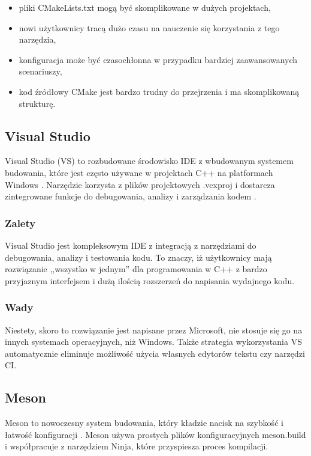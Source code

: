 \begin{itemize}
    \item pliki CMakeLists.txt mogą być skomplikowane w dużych projektach,
    \item nowi użytkownicy tracą dużo czasu na nauczenie się korzystania z tego narzędzia,
    \item konfiguracja może być czasochłonna w przypadku bardziej zaawansowanych scenariuszy,
    \item kod źródłowy CMake jest bardzo trudny do przejrzenia i ma skomplikowaną strukturę.
\end{itemize}

\subsection{Visual Studio}
Visual Studio (VS) to rozbudowane środowisko IDE z wbudowanym systemem budowania, które jest często używane w projektach C++ na platformach Windows \cite{vs}. Narzędzie korzysta z plików projektowych .vcxproj i dostarcza zintegrowane funkcje do debugowania, analizy i zarządzania kodem \cite{vs-cpp-debug}.

\subsubsection{Zalety}
Visual Studio jest kompleksowym IDE z integracją z narzędziami do debugowania, analizy i testowania kodu. To znaczy, iż użytkownicy mają rozwiązanie ,,wszystko w jednym'' dla programowania w C++ z bardzo przyjaznym interfejsem i dużą ilością rozszerzeń do napisania wydajnego kodu.

\subsubsection{Wady}
Niestety, skoro to rozwiązanie jest napisane przez Microsoft, nie stosuje się go na innych systemach operacyjnych, niż Windows. Także strategia wykorzystania VS automatycznie eliminuje możliwość użycia własnych edytorów tekstu czy narzędzi CI.

\subsection{Meson}
Meson to nowoczesny system budowania, który kładzie nacisk na szybkość i łatwość konfiguracji \cite{meson}. Meson używa prostych plików konfiguracyjnych meson.build i współpracuje z narzędziem Ninja, które przyspiesza proces kompilacji.

